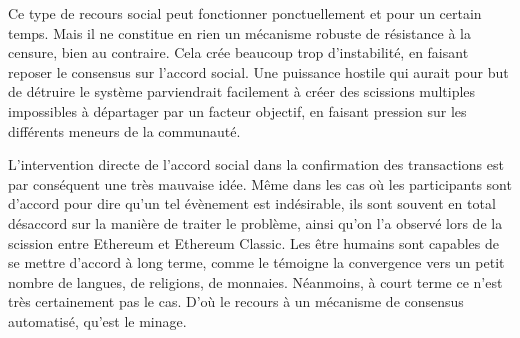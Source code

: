 %

Ce type de recours social peut fonctionner ponctuellement et pour un certain temps. Mais il ne constitue en rien un mécanisme robuste de résistance à la censure, bien au contraire. Cela crée beaucoup trop d'instabilité, en faisant reposer le consensus sur l'accord social. Une puissance hostile qui aurait pour but de détruire le système parviendrait facilement à créer des scissions multiples impossibles à départager par un facteur objectif, en faisant pression sur les différents meneurs de la communauté.

L'intervention directe de l'accord social dans la confirmation des transactions est par conséquent une très mauvaise idée. Même dans les cas où les participants sont d'accord pour dire qu'un tel évènement est indésirable, ils sont souvent en total désaccord sur la manière de traiter le problème, ainsi qu'on l'a observé lors de la scission entre Ethereum et Ethereum Classic. Les être humains sont capables de se mettre d'accord à long terme, comme le témoigne la convergence vers un petit nombre de langues, de religions, de monnaies. Néanmoins, à court terme ce n'est très certainement pas le cas. D'où le recours à un mécanisme de consensus automatisé, qu'est le minage.

